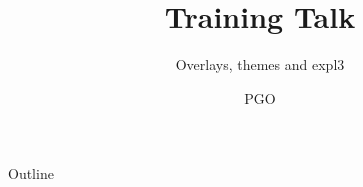 \documentclass{beamer}
\title{Training Talk}
\subtitle{Overlays, themes and expl3}
\author{PGO}
\institute{Tectonic}
\date{}
\begin{document}
\frame{\titlepage}
\begin{frame}{Outline}\tableofcontents\end{frame}
\end{document}
